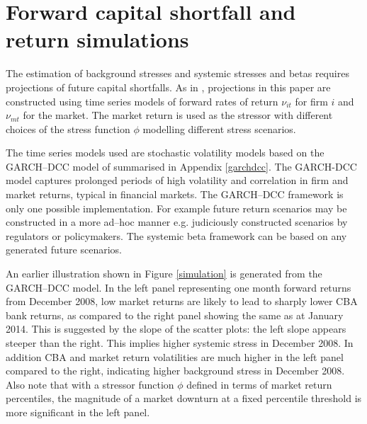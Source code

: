 \documentclass[12pt]{article}
\newcommand{\fref}[1]{Figure \ref{#1}}
\newcommand{\aref}[1]{Appendix \ref{#1}}
\begin{document}
\section{Forward capital shortfall and  return simulations}\label{simulate}

The estimation of background stresses and systemic stresses and betas requires projections of future capital shortfalls. As in \cite{brownlees2015}, projections in this paper are constructed  using time series models of forward rates of return $\nu_{it}$ for firm $i$ and $\nu_{mt}$ for the market. The market return is used as the stressor with different choices of the stress function $\phi$ modelling different stress scenarios.

The time series models used are stochastic volatility models based on the GARCH--DCC model of \cite{engle2002dynamic} summarised in \aref{garchdcc}. The GARCH-DCC model captures prolonged periods of high volatility and correlation in firm and market returns, typical in financial markets. The GARCH--DCC framework is only one possible implementation.   For example future return scenarios may be constructed in a more ad--hoc manner e.g. judiciously constructed scenarios by regulators or policymakers.   The  systemic beta framework can be based on  any  generated  future  scenarios.

An earlier illustration shown in \fref{simulation} is generated from the GARCH--DCC model.  In the left panel representing one month forward returns from December 2008, low market returns are likely to lead to sharply lower CBA bank returns, as compared to the right panel showing the same as at January 2014.   This is suggested by the slope of the scatter plots:  the left slope appears steeper than the right. This implies higher systemic stress in December 2008. In addition CBA and market return volatilities are much higher in the left panel compared to the right, indicating higher background stress in December 2008. Also note that with a stressor function $\phi$ defined in terms of market return percentiles, the magnitude of a market downturn at a fixed percentile threshold is more significant in the left panel.

\end{document}
